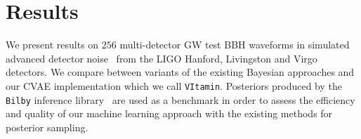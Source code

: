 \documentclass{article}
\begin{document}

%
%

%
%
%
%

\section{Results}

We present results on $256$ multi-detector \ac{GW} test \ac{BBH}
waveforms in simulated advanced detector noise~\cite{aligo_noisecurves}
from the LIGO Hanford, Livingston and Virgo detectors. We compare between
variants of the existing Bayesian approaches and our \ac{CVAE} implementation
which we call \texttt{VItamin}. Posteriors produced by the \texttt{Bilby}
inference library~\cite{1811.02042} are used as a benchmark in order to assess
the efficiency and quality of our machine learning approach with the existing
methods for posterior sampling.
\end{document}

